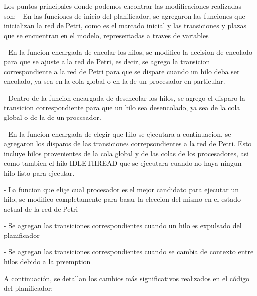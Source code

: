 
Los puntos principales donde podemos encontrar las modificaciones realizadas son:
- En las funciones de inicio del planificador, se agregaron las funciones que inicializan la red de Petri, como es el marcado inicial y las transiciones y plazas que se encuentran en el modelo, representadas a traves de variables

- En la funcion encargada de encolar los hilos, se modifico la decision de encolado para que se ajuste a la red de Petri, es decir, se agrego la transicion correspondiente a la red de Petri para que se dispare cuando un hilo deba ser encolado, ya sea en la cola global o en la de un procesador en particular.

- Dentro de la funcion encargada de desencolar los hilos, se agrego el disparo la transicion correspondiente para que un hilo sea desencolado, ya sea de la cola global o de la de un procesador.

- En la funcion encargada de elegir que hilo se ejecutara a continuacion, se agregaron los disparos de las transiciones correpsondientes a la red de Petri. Esto incluye hilos provenientes de la cola global y de las colas de los procesadores, asi como tambien el hilo IDLETHREAD que se ejecutara cuando no haya ningun hilo listo para ejecutar.

- La funcion que elige cual procesador es el mejor candidato para ejecutar un hilo, se modifico completamente para basar la eleccion del mismo en el estado actual de la red de Petri

- Se agregan las transiciones correspondientes cuando un hilo es expulsado del planificador

- Se agregan las transiciones correspondientes cuando se cambia de contexto entre hilos debido a la preemption









A continuación, se detallan los cambios más significativos realizados en el código del planificador:







